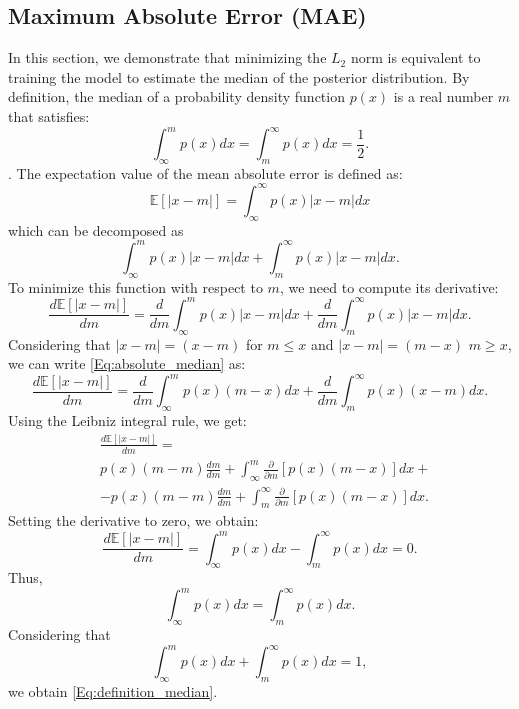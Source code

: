 \documentclass{aa}
\begin{document}
\begin{appendix}
\section{Maximum Absolute Error (MAE)}\label{Sec:appendix_Maximum Absolute Error}
In this section, we demonstrate that minimizing the $L_2$ norm is equivalent to training the model to estimate the median of the posterior distribution.
By definition, the median of a probability density function $p(x)$ is a real number $m$ that satisfies:
\begin{equation}\label{Eq:definition_median}
\int_{\infty}^{m} p(x)dx=\int_{m}^{\infty}p(x)dx=\frac{1}{2}.
\end{equation}. 
The expectation value of the mean absolute error is defined as:
\begin{equation}
    \mathbb{E}[|x-m|]= \int_{\infty}^{\infty}p(x)|x-m|dx  
\end{equation}
which can be decomposed as
\begin{equation}
        \int_{\infty}^{m}p(x)|x-m|dx +\int_{m}^{\infty}p(x)|x-m|dx .
\end{equation}
To minimize this function with respect to $m$, we need to compute its derivative:
\begin{equation}\label{Eq:absolute_median}
    \frac{d\mathbb{E}[|x-m|]}{dm}=
    \frac{d}{dm}\int_{\infty}^{m}p(x)|x-m|dx +\frac{d}{dm}\int_{m}^{\infty}p(x)|x-m|dx. 
\end{equation}
Considering that $|x-m|=(x-m)$ for $m\le x$ and $|x-m|=(m-x)$ $m\ge x$, 
we can write \autoref{Eq:absolute_median} as:
\begin{equation}
    \frac{d\mathbb{E}[|x-m|]}{dm}=
    \frac{d}{dm}\int_{\infty}^{m}p(x)(m-x)dx +\frac{d}{dm}\int_{m}^{\infty}p(x)(x-m)dx .
\end{equation}
Using the Leibniz integral rule, we get:
\begin{align}
    &\frac{d\mathbb{E}[|x-m|]}{dm}= \\
    &
    p(x)(m-m)\frac{dm}{dm}+\int_{\infty}^{m}\frac{\partial}{\partial m}[p(x)(m-x)]dx + \nonumber \\
    & - p(x)(m-m)\frac{dm}{dm}+\int_{m}^{\infty}\frac{\partial}{\partial m}[p(x)(m-x)]dx \nonumber .
\end{align}
Setting the derivative to zero, we obtain:
\begin{equation}
    \frac{d\mathbb{E}[|x-m|]}{dm}= \int_{\infty}^{m} p(x)dx-\int_{m}^{\infty}p(x)dx =0.
\end{equation}
Thus,
\begin{equation}
\int_{\infty}^{m} p(x)dx=\int_{m}^{\infty}p(x)dx .
\end{equation}
Considering that
\begin{equation}
\int_{\infty}^{m} p(x)dx+\int_{m}^{\infty}p(x)dx=1,
\end{equation}
we obtain \autoref{Eq:definition_median}.
\end{appendix}
\end{document}
